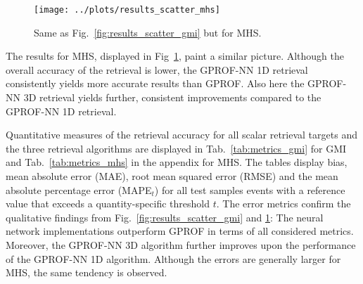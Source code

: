 \documentclass[a4paper,11pt,bibtotoc]{scrartcl}
\begin{document}
\begin{figure}[hbpt]
  \centering
  \texttt{[image: ../plots/results\_scatter\_mhs]}
  \caption{
    Same as Fig.~\ref{fig:results_scatter_gmi} but for MHS.
  }
  \label{fig:results_scatter_mhs}
\end{figure}

The results for MHS, displayed in Fig~\ref{fig:results_scatter_mhs}, paint a
similar picture. Although the overall accuracy of the retrieval is lower, the
GPROF-NN 1D retrieval consistently yields more accurate results than GPROF. Also
here the GPROF-NN 3D retrieval yields further, consistent improvements compared
to the GPROF-NN 1D retrieval.

Quantitative measures of the retrieval accuracy for all scalar retrieval targets
and the three retrieval algorithms are displayed in Tab.~\ref{tab:metrics_gmi}
for GMI and Tab.~\ref{tab:metrics_mhs} in the appendix for MHS.
The tables display bias, mean absolute error (MAE), root mean squared error
(RMSE) and the mean absolute percentage error (MAPE$_{t}$) for all test samples
events with a reference value that exceeds a quantity-specific threshold $t$.
The error metrics confirm the qualitative findings from
Fig.~\ref{fig:results_scatter_gmi} and \ref{fig:results_scatter_mhs}: The neural
network implementations outperform GPROF in terms of all considered metrics.
Moreover, the GPROF-NN 3D algorithm further improves upon the performance of
the GPROF-NN 1D algorithm. Although the errors are generally larger for MHS, the
same tendency is observed.
\end{document}
